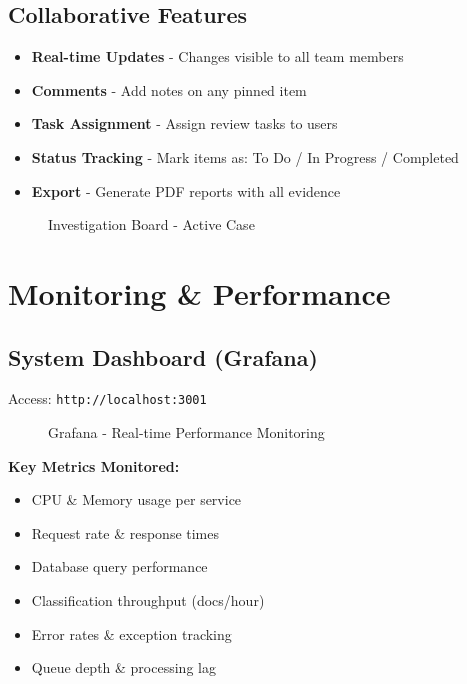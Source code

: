 \subsection{Collaborative Features}

\begin{itemize}
    \item \textbf{Real-time Updates} - Changes visible to all team members
    \item \textbf{Comments} - Add notes on any pinned item
    \item \textbf{Task Assignment} - Assign review tasks to users
    \item \textbf{Status Tracking} - Mark items as: To Do / In Progress / Completed
    \item \textbf{Export} - Generate PDF reports with all evidence
\end{itemize}

\begin{figure}[h]
\centering
{}
\caption{Investigation Board - Active Case}
\label{fig:investigation-board}
\end{figure}

\section{Monitoring \& Performance}

\subsection{System Dashboard (Grafana)}

Access: \texttt{http://localhost:3001}

\begin{figure}[h]
\centering
{}
\caption{Grafana - Real-time Performance Monitoring}
\label{fig:grafana}
\end{figure}

\textbf{Key Metrics Monitored:}
\begin{itemize}
    \item CPU \& Memory usage per service
    \item Request rate \& response times
    \item Database query performance
    \item Classification throughput (docs/hour)
    \item Error rates \& exception tracking
    \item Queue depth \& processing lag
\end{itemize}

